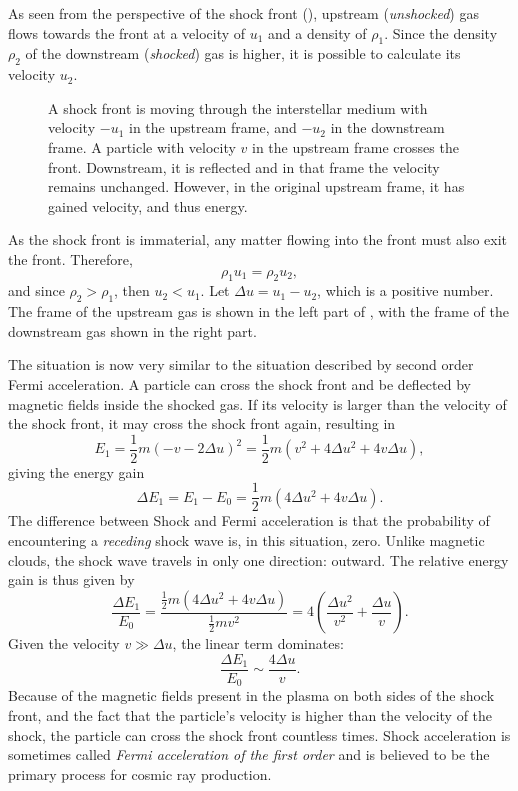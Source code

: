 As seen from the perspective of the shock front (),
upstream (\emph{unshocked}) gas flows towards the front at a velocity of
$u_1$ and a density of $\rho_1$.  Since the density $\rho_2$ of the downstream
(\emph{shocked}) gas is higher, it is possible to calculate its velocity
$u_2$.
\begin{figure}
\centering

\caption{  A shock front is moving
through the interstellar medium with velocity $-u_1$ in the upstream frame, and
$-u_2$ in the downstream frame.  A particle with velocity $v$ in the upstream
frame crosses the front.  Downstream, it is reflected and in that frame
the velocity remains unchanged.  However, in the original upstream frame, it
has gained velocity, and thus energy.}
\label{fig:fermi-1st-order}
\end{figure}
As the shock front is immaterial, any matter flowing into the front must also
exit the front. Therefore,
\begin{equation}
\rho_1 u_1 = \rho_2 u_2,
\end{equation}
and since $\rho_2 > \rho_1$, then $u_2 < u_1$.  Let $\Delta u =
u_1 - u_2$, which is a positive number.  The frame of the upstream gas is shown
in the left part of , with the frame of the
downstream gas shown in the right part.

The situation is now very similar to the situation described by second order Fermi
acceleration.  A particle can cross the shock front and be deflected by
magnetic fields inside the shocked gas.  If its velocity is larger than the
velocity of the shock front, it may cross the shock front again, resulting in
\begin{equation}
E_1 = \frac{1}{2} m (-v - 2\Delta u)^2 = \frac{1}{2} m (v^2 + 4\Delta u^2 +
4v\Delta u),
\end{equation}
giving the energy gain
\begin{equation}
\Delta E_1 = E_1 - E_0 = \frac{1}{2} m (4\Delta u^2 + 4v\Delta u).
\end{equation}
%
The difference between Shock and Fermi acceleration is that the probability of encountering
a \emph{receding} shock wave is, in this situation, zero.  Unlike magnetic
clouds, the shock wave travels in only one direction: outward.  The relative
energy gain is thus given by
\begin{equation}
\frac{\Delta E_1}{E_0} = \frac{\frac{1}{2} m (4\Delta u^2 +
4v\Delta u)}{\frac{1}{2} m v^2} = 4\left(\frac{\Delta u^2}{v^2} +
\frac{\Delta u}{v}\right).
\end{equation}
Given the velocity $v \gg \Delta u$, the linear term dominates:
\begin{equation}
\frac{\Delta E_1}{E_0} \sim \frac{4\Delta u}{v}.
\end{equation}
Because of the magnetic fields present in the plasma on both sides of the shock front,
and the fact that the particle's velocity is higher than the velocity of the
shock, the particle can cross the shock front countless times.  Shock
acceleration is sometimes called \emph{Fermi acceleration of the first order} and
is believed to be the primary process for cosmic ray production.


